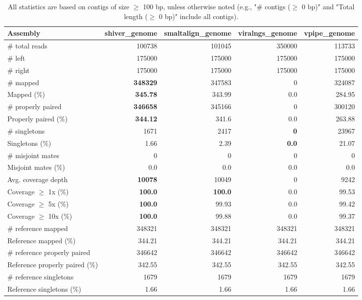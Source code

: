 \documentclass[12pt,a4paper]{article}
\begin{document}
\begin{table}[ht]
\begin{center}
\caption{All statistics are based on contigs of size $\geq$ 100 bp, unless otherwise noted (e.g., "\# contigs ($\geq$ 0 bp)" and "Total length ($\geq$ 0 bp)" include all contigs).}
\begin{tabular}{|l*{4}{|r}|}
\hline
Assembly & shiver\_genome & smaltalign\_genome & viralngs\_genome & vpipe\_genome \\ \hline
\# total reads & 100738 & 101045 & 350000 & 113733 \\ \hline
\# left & 175000 & 175000 & 175000 & 175000 \\ \hline
\# right & 175000 & 175000 & 175000 & 175000 \\ \hline
\# mapped & {\bf 348329} & 347583 & 0 & 324087 \\ \hline
Mapped (\%) & {\bf 345.78} & 343.99 & 0.0 & 284.95 \\ \hline
\# properly paired & {\bf 346658} & 345166 & 0 & 300120 \\ \hline
Properly paired (\%) & {\bf 344.12} & 341.6 & 0.0 & 263.88 \\ \hline
\# singletons & 1671 & 2417 & {\bf 0} & 23967 \\ \hline
Singletons (\%) & 1.66 & 2.39 & {\bf 0.0} & 21.07 \\ \hline
\# misjoint mates & 0 & 0 & 0 & 0 \\ \hline
Misjoint mates (\%) & 0.0 & 0.0 & 0.0 & 0.0 \\ \hline
Avg. coverage depth & {\bf 10078} & 10049 & 0 & 9242 \\ \hline
Coverage $\geq$ 1x (\%) & {\bf 100.0} & {\bf 100.0} & 0.0 & 99.53 \\ \hline
Coverage $\geq$ 5x (\%) & {\bf 100.0} & 99.93 & 0.0 & 99.42 \\ \hline
Coverage $\geq$ 10x (\%) & {\bf 100.0} & 99.88 & 0.0 & 99.37 \\ \hline
\# reference mapped & 348321 & 348321 & 348321 & 348321 \\ \hline
Reference mapped (\%) & 344.21 & 344.21 & 344.21 & 344.21 \\ \hline
\# reference properly paired & 346642 & 346642 & 346642 & 346642 \\ \hline
Reference properly paired (\%) & 342.55 & 342.55 & 342.55 & 342.55 \\ \hline
\# reference singletons & 1679 & 1679 & 1679 & 1679 \\ \hline
Reference singletons (\%) & 1.66 & 1.66 & 1.66 & 1.66 \\ \hline

\end{tabular}
\end{center}
\end{table}
\end{document}
